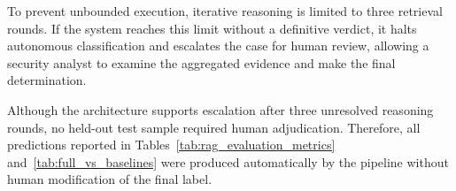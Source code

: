 To prevent unbounded execution, iterative reasoning is limited to three retrieval rounds. If the
system reaches this limit without a definitive verdict, it halts autonomous
classification and escalates the case for human review, allowing a security analyst to
examine the aggregated evidence and make the final determination.

Although the architecture supports escalation after three unresolved
reasoning rounds, no held-out test sample required human adjudication.
Therefore, all predictions reported in
Tables~\ref{tab:rag_evaluation_metrics} and~\ref{tab:full_vs_baselines}
were produced automatically by the pipeline without human modification
of the final label.




